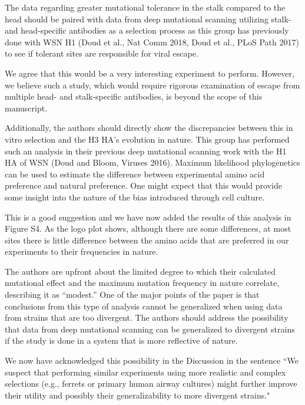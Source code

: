 \documentclass[11pt, oneside]{article}   	%
\newcommand{\response}[1]{{\color{black}#1}}
\begin{document}
The data regarding greater mutational tolerance in the stalk compared to the head should be paired with data from deep mutational scanning utilizing stalk- and head-specific antibodies as a selection process as this group has previously done with WSN H1 (Doud et al., Nat Comm 2018, Doud et al., PLoS Path 2017) to see if tolerant sites are responsible for viral escape. 

\response{We agree that this would be a very interesting experiment to perform.
However, we believe such a study, which would require rigorous examination of escape from multiple head- and stalk-specific antibodies, is beyond the scope of this manuscript.
}

Additionally, the authors should directly show the discrepancies between this in vitro selection and the H3 HA's evolution in nature. This group has performed such an analysis in their previous deep mutational scanning work with the H1 HA of WSN (Doud and Bloom, Viruses 2016). Maximum likelihood phylogenetics can be used to estimate the difference between experimental amino acid preference and natural preference. One might expect that this would provide some insight into the nature of the bias introduced through cell culture. 

\response{This is a good suggestion and we have now added the results of this analysis in Figure S4.
As the logo plot shows, although there are some differences, at most sites there is little difference between the amino acids that are preferred in our experiments to their frequencies in nature.
}

The authors are upfront about the limited degree to which their calculated mutational effect and the maximum mutation frequency in nature correlate, describing it as ``modest.'' One of the major points of the paper is that conclusions from this type of analysis cannot be generalized when using data from strains that are too divergent. The authors should address the possibility that data from deep mutational scanning can be generalized to divergent strains if the study is done in a system that is more reflective of nature. 

\response{We now have acknowledged this possibility in the Discussion in the sentence ``We suspect that performing similar experiments using more realistic and complex selections (e.g., ferrets or primary human airway cultures) might further improve their utility and possibly their generalizability to more divergent strains."}
\end{document}

